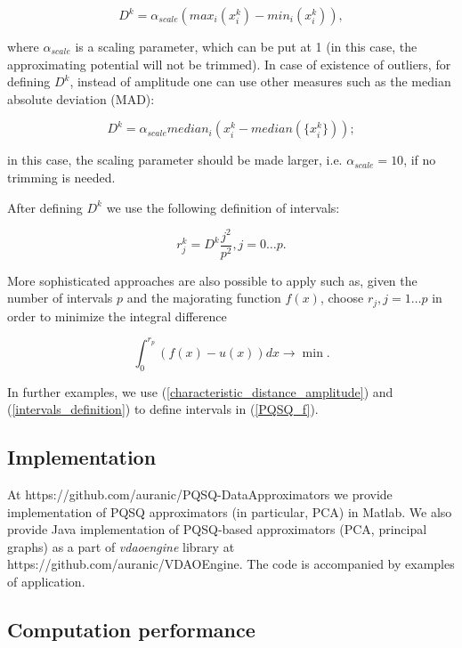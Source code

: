 \documentclass[preprint,12pt]{elsarticle}
\begin{document}
\begin{equation}\label{characteristic_distance_amplitude}
D^k = \alpha_{scale}(max_i(x_i^k)-min_i(x_i^k)),
\end{equation}

\noindent where $\alpha_{scale}$ is a scaling parameter, which can be put at 1 (in this case, the approximating potential will not be trimmed). In case of existence of outliers, for defining $D^k$, instead of amplitude one can use other measures such as the median absolute deviation (MAD):

\begin{equation}\label{characteristic_distance_mad}
D^k = \alpha_{scale}median_i(x_i^k-median(\{x_i^k\}));
\end{equation}

\noindent in this case, the scaling parameter should be made larger, i.e. $\alpha_{scale}=10$, if no trimming is needed.

After defining $D^k$ we use the following definition of intervals:

\begin{equation}\label{intervals_definition}
r_j^k = D^k\frac{j^2}{p^2}, j=0\dots p.
\end{equation}

More sophisticated approaches are also possible to apply such as, given the number of intervals $p$ and the majorating function $f(x)$, choose $r_j, j=1\dots p$ in order to minimize the integral difference

$$
\int_0^{r_p}(f(x)-u(x))dx \rightarrow \min.
$$

In further examples, we use (\ref{characteristic_distance_amplitude}) and (\ref{intervals_definition}) to define intervals in (\ref{PQSQ_f}).

\subsection{Implementation}

At https://github.com/auranic/PQSQ-DataApproximators we provide implementation of PQSQ approximators (in particular, PCA) in Matlab. We also provide Java implementation of PQSQ-based approximators (PCA, principal graphs) as a part of \emph{vdaoengine} library at https://github.com/auranic/VDAOEngine. The code is accompanied by examples of application.




\subsection{Computation performance}
\end{document}
